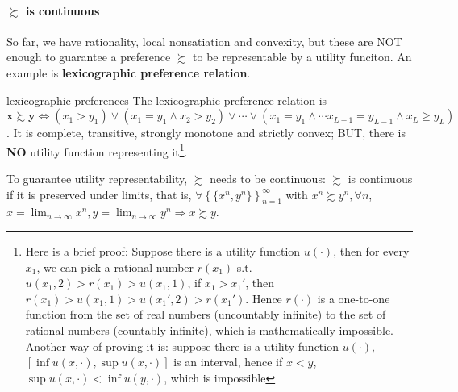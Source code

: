 \paragraph*{$\succsim$ is continuous}
So far, we have rationality, local nonsatiation and convexity, but these are NOT enough to guarantee a preference $\succsim$ to be representable by a utility funciton. An example is \textbf{lexicographic preference relation}.
\begin{example}{lexicographic preferences}{}
    The lexicographic preference relation is $\mathbf{x}\succsim \mathbf{y}\Leftrightarrow \left(x_1>y_1 \right) \lor \left( x_1=y_1 \land x_2> y_2\right) \lor \cdots \lor \left( x_1=y_1 \land \cdots x_{L-1}=y_{L-1} \land x_L\geq y_L \right)$. It is complete, transitive, strongly monotone and strictly convex; BUT, there is \textbf{NO} utility function
representing it\footnote{Here is a brief proof: Suppose there is a utility function $u(\cdot)$, then for every $x_1$, we can pick a rational number $r(x_1)$ s.t. $u(x_1,2)>r(x_1)>u(x_1,1)$, if $x_1 >x_1'$, then $r(x_1)>u(x_1,1)>u(x_1',2)>r(x_1')$. Hence $r(\cdot)$ is a one-to-one function from the set of real numbers (uncountably infinite) to the set of rational numbers (countably infinite), which is mathematically impossible. Another way of proving it is: suppose there is a utility function $u(\cdot)$, $[\inf u(x,\cdot),\sup u(x,\cdot)]$ is an interval, hence if $x<y$, $\sup u(x,\cdot)<\inf u(y,\cdot)$, which is impossible}.
\end{example}
To guarantee utility representability, $\succsim$ needs to be continuous: $\succsim$ is continuous if it is preserved under limits, that is, $\forall \left\{\{x^n,y^n\}\right\}^{\infty}_{n=1}$ with $x^n\succsim y^n, \forall n$, $x=\lim_{n\rightarrow\infty}x^n,y=\lim_{n\rightarrow\infty}y^n\Rightarrow x\succsim y$.

